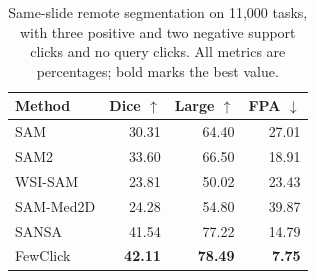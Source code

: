 \begin{table}[t]
\centering
\caption{Same-slide remote segmentation on 11,000 tasks, with three positive and two negative support clicks and no query clicks. All metrics are percentages; bold marks the best value.}
\label{tab:remote}
\small
\setlength{\tabcolsep}{4pt}
\begin{tabular}{@{}lrrr@{}}
\toprule
Method & Dice $\uparrow$ & Large $\uparrow$ & FPA $\downarrow$ \\
\midrule
SAM & 30.31 & 64.40 & 27.01 \\
SAM2 & 33.60 & 66.50 & 18.91 \\
WSI-SAM & 23.81 & 50.02 & 23.43 \\
SAM-Med2D & 24.28 & 54.80 & 39.87 \\
SANSA & 41.54 & 77.22 & 14.79 \\
FewClick & \textbf{42.11} & \textbf{78.49} & \textbf{7.75} \\
\bottomrule
\end{tabular}
\end{table}
